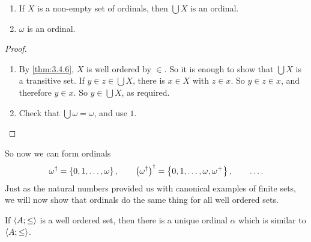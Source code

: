 \begin{corollary}
\label{cor:3.4.7}
\hfill
\begin{enumerate}
\item If $ X $ is a non-empty set of ordinals, then $ \bigcup X $ is an ordinal.
\item $ \omega $ is an ordinal.
\end{enumerate}
\end{corollary}

\begin{proof}
\hfill
\begin{enumerate}
\item By \ref{thm:3.4.6}, $ X $ is well ordered by $ \in $. So it is enough to show that $ \bigcup X $ is a transitive set. If $ y \in z \in \bigcup X $, there is $ x \in X $ with $ z \in x $. So $ y \in z \in x $, and therefore $ y \in x $. So $ y \in \bigcup X $, as required.
\item Check that $ \bigcup \omega = \omega $, and use $ 1 $.
\end{enumerate}
\end{proof}

\pagebreak

So now we can form ordinals
$$ \omega^\dagger = \left\{ 0, 1, \dots, \omega \right\}, \qquad \left( \omega^\dagger \right)^\dagger = \left\{ 0, 1, \dots, \omega, \omega^+ \right\}, \qquad \dots. $$
Just as the natural numbers provided us with canonical examples of finite sets, we will now show that ordinals do the same thing for all well ordered sets.

\begin{theorem}
\label{thm:3.4.8}
If $ \left\langle A; \le \right\rangle $ is a well ordered set, then there is a unique ordinal $ \alpha $ which is similar to $ \left\langle A; \le \right\rangle $.
\end{theorem}

